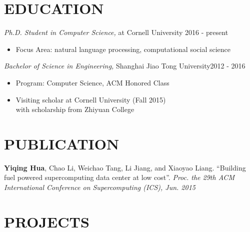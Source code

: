 \documentclass[margin, 10pt]{res} %
\begin{document}
\begin{resume}



\section{EDUCATION}

{\sl Ph.D. Student in Computer Science,} at Cornell University \hfill 2016 - present \\
\begin{itemize}
\item Focus Area: natural language processing, computational social science
\end{itemize}
{\sl Bachelor of Science in Engineering,} Shanghai Jiao Tong University\hfill 2012 - 2016\\
\begin{itemize} 
\item Program: Computer Science, ACM Honored Class
\item Visiting scholar at Cornell University (Fall 2015) \\with scholarship from Zhiyuan College
\end{itemize}


\section{PUBLICATION}
\textbf{Yiqing Hua}, Chao Li, Weichao Tang, Li Jiang, and Xiaoyao Liang. 
“Building fuel powered supercomputing data center at low cost”.
\textit{Proc. the 29th ACM International Conference on Supercomputing (ICS), Jun. 2015}


 
\section{PROJECTS}


\end{resume}
\end{document}
